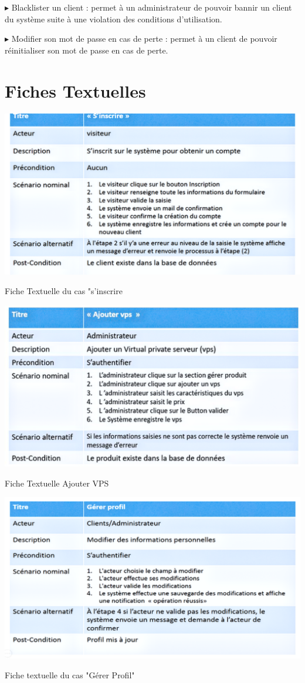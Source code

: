 \documentclass[a4paper, 12pt]{report}
\begin{document}
\noindent $\blacktriangleright$ Blacklister un client : permet à un administrateur de pouvoir bannir un client du système suite à une violation des conditions d’utilisation.

\noindent $\blacktriangleright$ Modifier son mot de passe en cas de perte : permet à un client de pouvoir réinitialiser son mot de passe en cas de perte.

\section{Fiches Textuelles}
\begin{table}[H]
	\centering
	\includegraphics{img/fiche/1}
	\caption{Fiche Textuelle du cas "s’inscrire}
	\label{Tux}
\end{table}
\begin{table}[H]
	\centering
	\includegraphics{img/fiche/2}
	\caption{Fiche Textuelle Ajouter VPS}
	\label{Tux}
\end{table}
\begin{table}[H]
	\centering
	\includegraphics{img/fiche/3}
	\caption{Fiche textuelle du cas "Gérer Profil"}
	\label{Tux}
\end{table}
\end{document}
